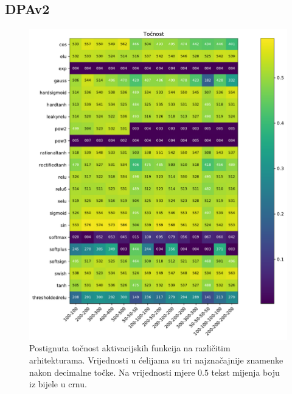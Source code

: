 \documentclass[times, utf8, numeric, diplomski]{fer}
\begin{document}
\subsection{DPAv2}

\begin{figure}[H]
\includegraphics[width=\textwidth]{greedy_256_acc.pdf}
\centering
\caption{Postignuta točnost aktivacijskih funkcija na različitim arhitekturama. Vrijednosti u ćelijama su tri najznačajnije znamenke nakon decimalne točke. Na vrijednosti mjere $0.5$ tekst mijenja boju iz bijele u crnu.}
\label{fig:greedy_256_acc}
\end{figure}
\end{document}
